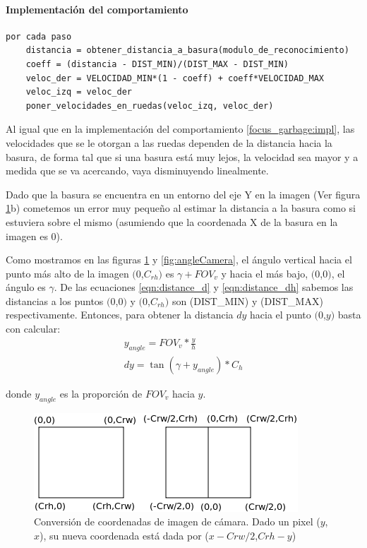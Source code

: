 \paragraph{Implementaci\'on del comportamiento}
\label{go_to_garbage:impl}
\begin{verbatim}
por cada paso
    distancia = obtener_distancia_a_basura(modulo_de_reconocimiento)
    coeff = (distancia - DIST_MIN)/(DIST_MAX - DIST_MIN)
    veloc_der = VELOCIDAD_MIN*(1 - coeff) + coeff*VELOCIDAD_MAX
    veloc_izq = veloc_der
    poner_velocidades_en_ruedas(veloc_izq, veloc_der)
\end{verbatim}

Al igual que en la implementaci\'on del comportamiento \ref{focus_garbage:impl},
las velocidades que se le otorgan a las ruedas dependen de la distancia
hacia la basura, de forma tal que si una basura est\'a muy lejos, la velocidad
sea mayor y a medida que se va acercando, vaya disminuyendo linealmente.

Dado que la basura se encuentra en un entorno del eje Y en la imagen (Ver figura
\ref{fig:image_coord_conv}b) cometemos un error muy peque\~no al estimar la
distancia a la basura como si estuviera sobre el mismo (asumiendo que la
coordenada X de la basura en la imagen es 0).

Como mostramos en las figuras \ref{fig:image_coord_conv} y
\ref{fig:angleCamera}, el \'angulo vertical hacia el punto m\'as alto de la
imagen $(0$,$C_{rh})$ es $\gamma+FOV_v$ y hacia el m\'as bajo, $(0$,$0)$, el
\'angulo es $\gamma$. De las ecuaciones \eqref{eqn:distance_d} y
\eqref{eqn:distance_dh} sabemos las distancias a los puntos $(0$,$0)$ y
$(0$,$C_{rh})$ son (DIST\_MIN) y (DIST\_MAX) respectivamente.
Entonces, para obtener la distancia $dy$ hacia el punto $(0$,$y)$ basta con
calcular:
\begin{eqnarray}
y_{angle} = FOV_v * \frac{y}{h} \\
dy = \tan(\gamma + y_{angle}) * C_h
\end{eqnarray}

donde $y_{angle}$ es la proporci\'on de $FOV_v$ hacia $y$.
\begin{figure}[htp]
\begin{center}
\includegraphics[scale=0.5]{comportamientos/figures/imageCoordsConvertion.png}
\caption[Conversi\'on de coordenadas de imagen de c\'amara]{Conversi\'on de
		coordenadas de imagen de c\'amara. Dado un pixel ($y$,$x$), su nueva
		coordenada est\'a dada por ($x-Crw/2$,$Crh-y$)}
\label{fig:image_coord_conv}
\end{center}
\end{figure}

